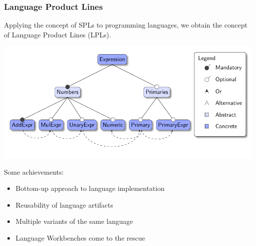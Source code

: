 \documentclass[9pt,xcolor=table,svgnames]{beamer}
\begin{document}
\begin{frame}[noframenumbering]
    \frametitle{Language Product Lines}
    Applying the concept of SPLs to programming languages, we obtain the concept of \alert{Language Product Lines} (LPLs).

    \bigskip
    \includegraphics[width=1\textwidth]{figs/feature-model.pdf}

    \pause

    \huge Some achievements:
    \normalsize
    \begin{itemize}
        \item \alert{Bottom-up} approach to language implementation
        \item \alert{Reusability} of language artifacts
        \item Multiple \alert{variants} of the same language
        \item \alert{Language Workbenches} come to the rescue
    \end{itemize}
\end{frame}
\end{document}

